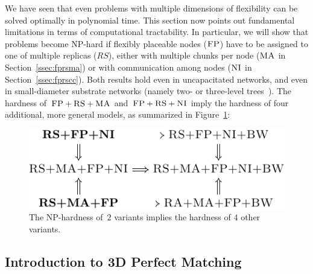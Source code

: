 \documentclass[preprint,12pt]{elsarticle}
\newcommand{\maciek}[1]{\textcolor{brown}{maciek: #1}}
\newcommand{\CC}{\textsc{NI}}
\newcommand{\FP}{\textsc{FP}}
\newcommand{\RS}{\textsc{RS}}
\newcommand{\MA}{\textsc{MA}}
\begin{document}
We have seen that even problems with multiple dimensions of
flexibility can be solved optimally in polynomial time.
This section now points out fundamental
limitations in terms of computational tractability.
In particular, we
will show that problems become NP-hard if flexibly placeable nodes ($\FP$) have to be assigned to one of multiple replicas ($RS$), either with multiple chunks per node ($\MA$ in Section~\ref{ssec:fprsma}) or with communication among nodes ($\CC$ in Section~\ref{ssec:fprscc}).
Both results hold even in uncapacitated networks, and even in small-diameter
substrate networks (namely two- or three-level trees~\cite{fattree}).
The hardness of~$\FP+\RS+\MA$ and~$\FP+\RS+\CC$ imply
the hardness of four additional, more general models, as
summarized in Figure~\ref{fig:np_implications}:\\
\begin{figure}[htbp]
\centering
\includegraphics[width = .6\columnwidth]{figs/np_implications}
\caption{The NP-hardness of~$2$ variants implies the hardness of 
$4$ other variants.}
\label{fig:np_implications}
\end{figure}


\subsection{Introduction to 3D Perfect Matching}
\label{sec:3dm_intro}
\end{document}
